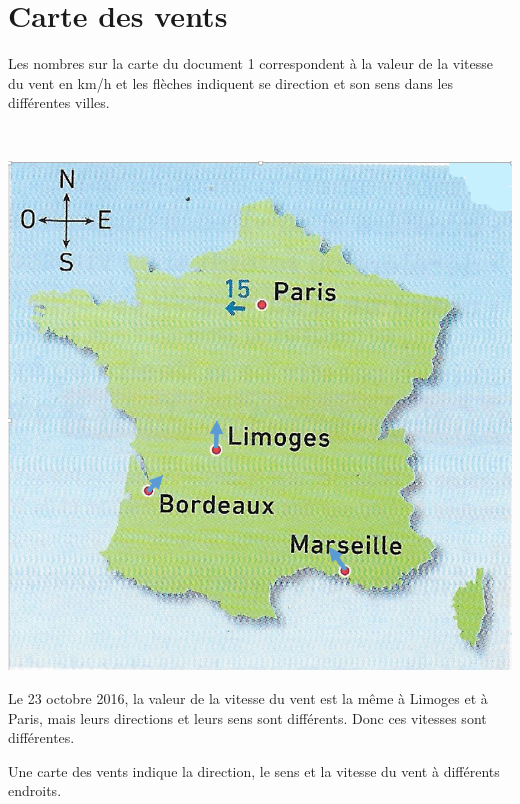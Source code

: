\section{Carte des vents}

\begin{questions}
	\question Les nombres sur la carte du document 1 correspondent à la valeur de la vitesse du vent en km/h et les flèches indiquent se direction et son sens dans les différentes villes.
	
	\question \ \\
		\begin{center}
			\includegraphics[scale=0.4]{carte2}
		\end{center}
		
	\question Le 23 octobre 2016, la valeur de la vitesse du vent est la même à Limoges et à Paris, mais leurs directions et leurs sens sont différents. Donc ces vitesses sont différentes.
	
	\question Une carte des vents indique la direction, le sens et la vitesse du vent à différents endroits.
\end{questions}